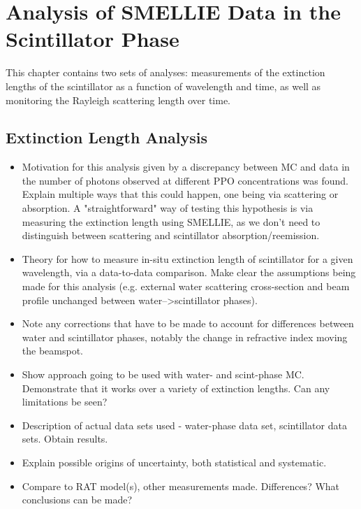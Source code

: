 \chapter{Analysis of SMELLIE Data in the Scintillator Phase}\label{chap:smellie_analysis}
{
    \color{blue}
    This chapter contains two sets of analyses: measurements of the extinction lengths of the scintillator as a function of wavelength and time, as well as monitoring the Rayleigh scattering length over time.

\section{Extinction Length Analysis}
\begin{itemize}
    \item Motivation for this analysis given by a discrepancy between MC and data in the number of photons observed at different PPO concentrations was found. Explain multiple ways that this could happen, one being via scattering or absorption. A "straightforward" way of testing this hypothesis is via measuring the extinction length using SMELLIE, as we don't need to distinguish between scattering and scintillator absorption/reemission.
    \item Theory for how to measure in-situ extinction length of scintillator for a given wavelength, via a data-to-data comparison. Make clear the assumptions being made for this analysis (e.g. external water scattering cross-section and beam profile unchanged between water-->scintillator phases).
    \item Note any corrections that have to be made to account for differences between water and scintillator phases, notably the change in refractive index moving the beamspot.
    \item Show approach going to be used with water- and scint-phase MC. Demonstrate that it works over a variety of extinction lengths. Can any limitations be seen?
    \item Description of actual data sets used - water-phase data set, scintillator data sets. Obtain results.
    \item Explain possible origins of uncertainty, both statistical and systematic.
    \item Compare to RAT model(s), other measurements made. Differences? What conclusions can be made?
\end{itemize}

}
